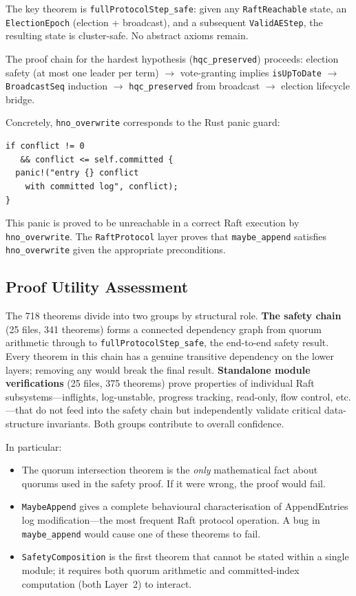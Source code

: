 \documentclass[sigconf,10pt]{acmart}
\begin{document}
The key theorem is \texttt{fullProtocolStep\_safe}: given any
\texttt{RaftReachable} state, an \texttt{ElectionEpoch} (election +
broadcast), and a subsequent \texttt{ValidAEStep}, the resulting state
is cluster-safe.  No abstract axioms remain.

The proof chain for the hardest hypothesis (\texttt{hqc\_preserved})
proceeds: election safety (at most one leader per term) $\to$
vote-granting implies \texttt{isUpToDate} $\to$
\texttt{BroadcastSeq} induction $\to$
\texttt{hqc\_preserved} from broadcast $\to$
election lifecycle bridge.

Concretely, \texttt{hno\_overwrite} corresponds to the Rust panic guard:
\begin{lstlisting}[language=Rust2]
if conflict != 0
   && conflict <= self.committed {
  panic!("entry {} conflict
    with committed log", conflict);
}
\end{lstlisting}
This panic is proved to be unreachable in a correct Raft execution by
\texttt{hno\_overwrite}.  The \texttt{RaftProtocol} layer
proves that \texttt{maybe\_append} satisfies \texttt{hno\_overwrite} given
the appropriate preconditions.

\subsection{Proof Utility Assessment}

The 718 theorems divide into two groups by structural role.
\textbf{The safety chain} (25 files, 341 theorems) forms a connected
dependency graph from quorum arithmetic through to
\texttt{fullProtocolStep\_safe}, the end-to-end safety result.
Every theorem in this chain has a genuine transitive dependency on the
lower layers; removing any would break the final result.
\textbf{Standalone module verifications} (25 files, 375 theorems) prove
properties of individual Raft subsystems---inflights, log-unstable,
progress tracking, read-only, flow control, etc.---that do not feed
into the safety chain but independently validate critical data-structure
invariants.  Both groups contribute to overall confidence.

In particular:

\begin{itemize}\setlength\itemsep{0pt}
\item The quorum intersection theorem is the \emph{only} mathematical
  fact about quorums used in the safety proof.  If it were wrong, the proof would
  fail.
\item \texttt{MaybeAppend} gives a complete behavioural
  characterisation of AppendEntries log modification---the most frequent
  Raft protocol operation.  A bug in \texttt{maybe\_append} would cause
  one of these theorems to fail.
\item \texttt{SafetyComposition} is the first theorem that cannot
  be stated within a single module; it requires both quorum arithmetic
  and committed-index computation (both Layer~2) to interact.
\end{itemize}
\end{document}

